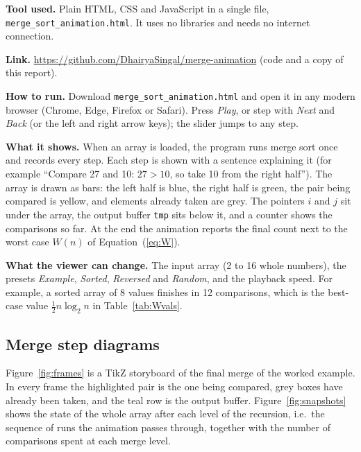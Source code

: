 \documentclass[11pt,a4paper]{article}
\theoremstyle{plain}
\theoremstyle{definition}
\renewcommand{\lg}{\log_2}
\begin{document}
\textbf{Tool used.} Plain HTML, CSS and JavaScript in a single file, \texttt{merge\_sort\_animation.html}. It uses no libraries and needs no internet connection.

\noindent\textbf{Link.} \url{https://github.com/DhairyaSingal/merge-animation} (code and a copy of this report).

\noindent\textbf{How to run.} Download \texttt{merge\_sort\_animation.html} and open it in any modern browser (Chrome, Edge, Firefox or Safari). Press \emph{Play}, or step with \emph{Next} and \emph{Back} (or the left and right arrow keys); the slider jumps to any step.

\noindent\textbf{What it shows.} When an array is loaded, the program runs merge sort once and records every step. Each step is shown with a sentence explaining it (for example ``Compare 27 and 10: $27>10$, so take 10 from the right half''). The array is drawn as bars: the left half is blue, the right half is green, the pair being compared is yellow, and elements already taken are grey. The pointers $i$ and $j$ sit under the array, the output buffer \texttt{tmp} sits below it, and a counter shows the comparisons so far. At the end the animation reports the final count next to the worst case $W(n)$ of Equation~(\ref{eq:W}).

\noindent\textbf{What the viewer can change.} The input array (2 to 16 whole numbers), the presets \emph{Example}, \emph{Sorted}, \emph{Reversed} and \emph{Random}, and the playback speed. For example, a sorted array of 8 values finishes in 12 comparisons, which is the best-case value $\tfrac12 n\lg n$ in Table~\ref{tab:Wvals}.

\subsection{Merge step diagrams}\label{sec:diagrams}
Figure~\ref{fig:frames} is a TikZ storyboard of the final merge of the worked example. In every frame the highlighted pair is the one being compared, grey boxes have already been taken, and the teal row is the output buffer. Figure~\ref{fig:snapshots} shows the state of the whole array after each level of the recursion, i.e.\ the sequence of runs the animation passes through, together with the number of comparisons spent at each merge level.
\end{document}

